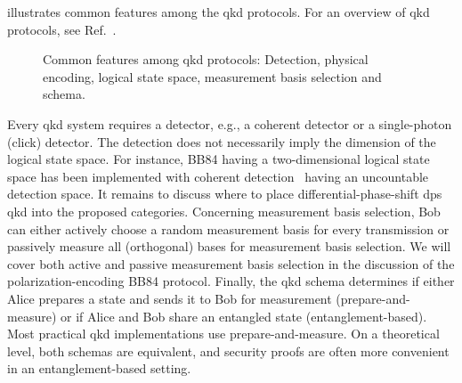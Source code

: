  illustrates common features among the \gls{qkd} protocols.
For an overview of \gls{qkd} protocols, see Ref.~\cite{Duvsek2006}.
\begin{figure}[htb]
	\centering
	
	\caption{Common features among \gls{qkd} protocols: Detection, physical encoding, logical state space, measurement basis selection and schema.}\label{fig:qkd_classification}
\end{figure}
Every \gls{qkd} system requires a detector, e.g., a coherent detector or a single-photon (click) detector.
The detection does not necessarily imply the dimension of the logical state space.
For instance, BB84 having a two-dimensional logical state space has been implemented with coherent detection~\cite{Qi2021} having an uncountable detection space.
It remains to discuss where to place differential-phase-shift \gls{dps} \gls{qkd} into the proposed categories.
Concerning measurement basis selection, Bob can either actively choose a random measurement basis for every transmission or passively measure all (orthogonal) bases for measurement basis selection.
We will cover both active and passive measurement basis selection in the discussion of the polarization-encoding BB84 protocol.
Finally, the \gls{qkd} schema determines if either Alice prepares a state and sends it to Bob for measurement (prepare-and-measure) or if Alice and Bob share an entangled state (entanglement-based).
Most practical \gls{qkd} implementations use prepare-and-measure.
On a theoretical level, both schemas are equivalent, and security proofs are often more convenient in an entanglement-based setting.